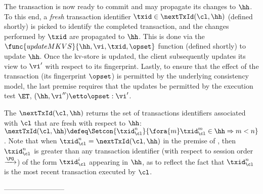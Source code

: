 The transaction is now ready to commit and may propagate its changes to $\hh$.
To this end, a \emph{fresh} transaction identifier $\txid \in \nextTxId(\cl, \hh)$ (defined shortly) is picked
to identify the completed transaction, and the changes performed by $\txid$ are propagated to $\hh$. 
This is done via the $\func{updateMKVS}{\hh, \vi, \txid, \opset}$ function (defined shortly) to update $\hh$. 
Once the kv-store is updated, the client subsequently updates its view to $\vi'$ with respect to its fingerprint. 
Lastly, to ensure that the effect of the transaction (its fingerprint  $\opset$) is permitted by the underlying consistency model, 
the last premise requires that the updates be permitted by the execution test $\ET$, \ie \( (\hh, \vi'') \etto \opset : \vi'\).

The $\nextTxId(\cl, \hh)$ returns the set of transactions identifiers associated with $\cl$ that are fresh with respect to $\hh$: 
$\nextTxId(\cl, \hh) \defeq \Setcon{\txid_{\cl}^{n}}{\fora{m} \txid_{\cl}^{m} \in \hh \Rightarrow m < n }$.
Note that when $\txid_\cl^n = \nextTxId(\cl, \hh)$ in the premise of , then $\txid_\cl^n$ is greater than any transaction identifier 
(with respect to session order $\xrightarrow{\PO}$) 
of the form $\txid_{\cl}^{i}$ appearing in $\hh$,
as to reflect the fact that $\txid_\cl^n$ is the most recent transaction executed by $\cl$.


--------------------------

